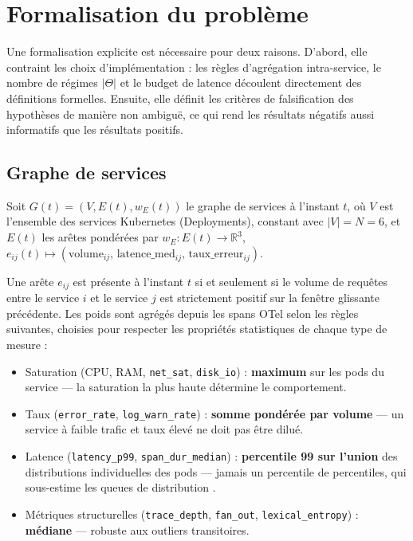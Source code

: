 
\section{Formalisation du problème}
\label{sec:formalisation}

Une formalisation explicite est nécessaire pour deux raisons. D'abord, elle contraint les
choix d'implémentation : les règles d'agrégation intra-service, le nombre de régimes $|\Theta|$
et le budget de latence découlent directement des définitions formelles.
Ensuite, elle définit les critères de falsification des hypothèses de manière non ambiguë,
ce qui rend les résultats négatifs aussi informatifs que les résultats positifs.

\subsection{Graphe de services}
\label{sec:graph}

Soit $G(t) = (V, E(t), w_E(t))$ le graphe de services à l'instant $t$, où $V$ est
l'ensemble des services Kubernetes (Deployments), constant avec $|V| = N = 6$,
et $E(t)$ les arêtes pondérées par
$w_E : E(t) \to \mathbb{R}^3$, $e_{ij}(t) \mapsto (\text{volume}_{ij},\,
\text{latence\_med}_{ij},\, \text{taux\_erreur}_{ij})$.

Une arête $e_{ij}$ est présente à l'instant $t$ si et seulement si le volume de requêtes
entre le service $i$ et le service $j$ est strictement positif sur la fenêtre glissante
précédente. Les poids sont agrégés depuis les spans OTel selon les règles suivantes,
choisies pour respecter les propriétés statistiques de chaque type de mesure :
\begin{itemize}
  \item Saturation (CPU, RAM, \texttt{net\_sat}, \texttt{disk\_io}) : \textbf{maximum}
    sur les pods du service --- la saturation la plus haute détermine le comportement.
  \item Taux (\texttt{error\_rate}, \texttt{log\_warn\_rate}) : \textbf{somme pondérée
    par volume} --- un service à faible trafic et taux élevé ne doit pas être dilué.
  \item Latence (\texttt{latency\_p99}, \texttt{span\_dur\_median}) : \textbf{percentile
    99 sur l'union} des distributions individuelles des pods --- jamais un percentile de
    percentiles, qui sous-estime les queues de distribution \cite{gregg2013}.
  \item Métriques structurelles (\texttt{trace\_depth}, \texttt{fan\_out},
    \texttt{lexical\_entropy}) : \textbf{médiane} --- robuste aux outliers transitoires.
\end{itemize}

